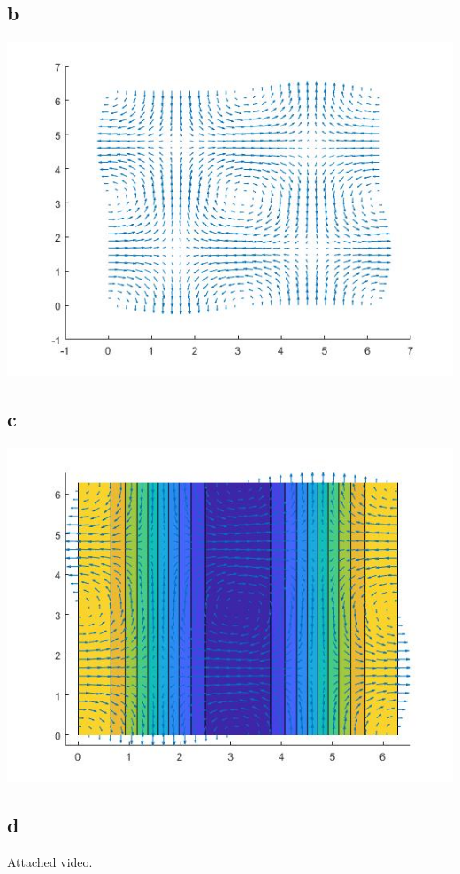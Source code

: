 \documentclass{article}
\begin{document}
\subsection{b}
\includegraphics[width=\textwidth]{1b}

\subsection{c}
\includegraphics[width=\textwidth]{1c}

\subsection{d}
Attached video.
\end{document}
